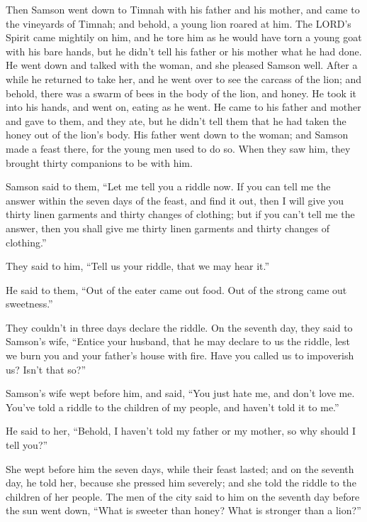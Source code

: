  Then Samson went down to Timnah with his father and his
mother, and came to the vineyards of Timnah; and behold, a young lion
roared at him.  The LORD's Spirit came mightily on him, and
he tore him as he would have torn a young goat with his bare hands, but
he didn't tell his father or his mother what he had done. 
He went down and talked with the woman, and she pleased Samson well.
 After a while he returned to take her, and he went over to
see the carcass of the lion; and behold, there was a swarm of bees in
the body of the lion, and honey.  He took it into his hands,
and went on, eating as he went. He came to his father and mother and
gave to them, and they ate, but he didn't tell them that he had taken
the honey out of the lion's body.  His father went down to
the woman; and Samson made a feast there, for the young men used to do
so.  When they saw him, they brought thirty companions to
be with him.

 Samson said to them, ``Let me tell you a riddle now. If
you can tell me the answer within the seven days of the feast, and find
it out, then I will give you thirty linen garments and thirty changes of
clothing;  but if you can't tell me the answer, then you
shall give me thirty linen garments and thirty changes of clothing.''

They said to him, ``Tell us your riddle, that we may hear it.''

 He said to them, ``Out of the eater came out food. Out of
the strong came out sweetness.''

They couldn't in three days declare the riddle.  On the
seventh day, they said to Samson's wife, ``Entice your husband, that he
may declare to us the riddle, lest we burn you and your father's house
with fire. Have you called us to impoverish us? Isn't that so?''

 Samson's wife wept before him, and said, ``You just hate
me, and don't love me. You've told a riddle to the children of my
people, and haven't told it to me.''

He said to her, ``Behold, I haven't told my father or my mother, so why
should I tell you?''

 She wept before him the seven days, while their feast
lasted; and on the seventh day, he told her, because she pressed him
severely; and she told the riddle to the children of her people.
 The men of the city said to him on the seventh day before
the sun went down, ``What is sweeter than honey? What is stronger than a
lion?''


